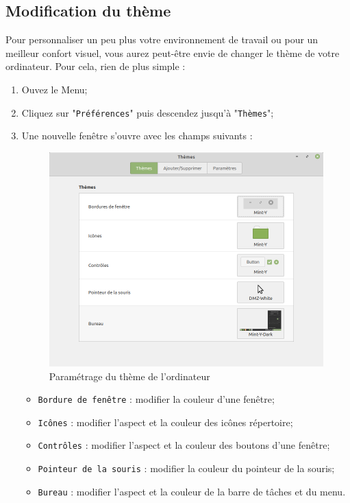 \documentclass[12pt]{book}
\begin{document}
	\subsection{Modification du thème}\label{sec:theme}
		 Pour personnaliser un peu plus votre environnement de travail ou pour un meilleur confort visuel, vous aurez peut-être envie de changer le thème de votre ordinateur.
		 Pour cela, rien de plus simple :
		 \begin{enumerate}
		 	\item Ouvez le Menu;
		 	\item Cliquez sur "\texttt{Préférences}" puis descendez jusqu'à "\texttt{Thèmes}";
		 	\item Une nouvelle fenêtre s'ouvre avec les champs suivants :
		 	\begin{figure}[h]
		 		\centering
		 		\includegraphics[width=.8\textwidth]{include/themes.png}
		 		\caption{Paramétrage du thème de l'ordinateur}
		 		\label{fig:themes}
		 	\end{figure}
		 	\begin{itemize}
		 		\item \texttt{Bordure de fenêtre} : modifier la couleur d'une fenêtre;
		 		\item \texttt{Icônes} : modifier l'aspect et la couleur des icônes répertoire;
		 		\item \texttt{Contrôles} : modifier l'aspect et la couleur des boutons d'une fenêtre;
		 		\item \texttt{Pointeur de la souris} : modifier la couleur du pointeur de la souris;
		 		\item \texttt{Bureau} : modifier l'aspect et la couleur de la barre de tâches et du menu.
		 	\end{itemize}
		 \end{enumerate}
\end{document}
